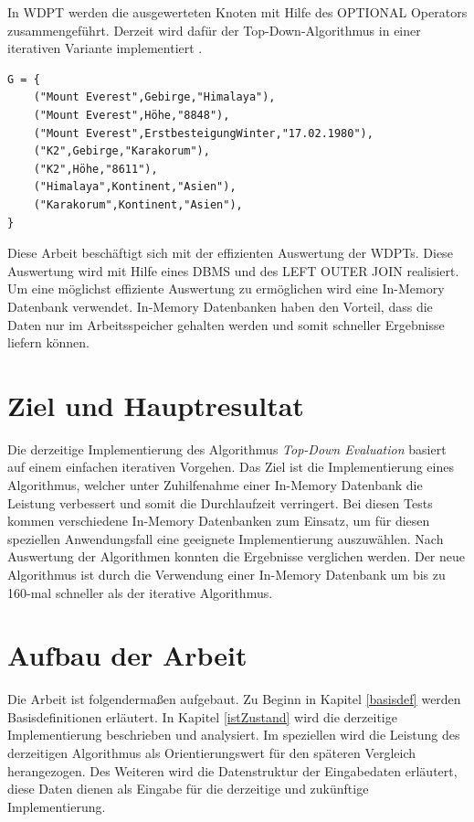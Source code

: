 \documentclass[draft,final]{vutinfth} %
\begin{document}
\pagebreak

In WDPT werden die ausgewerteten Knoten mit Hilfe des OPTIONAL Operators zusammengeführt. Derzeit wird dafür der Top-Down-Algorithmus \cite{LPPS2013} in einer iterativen Variante implementiert \cite{OptMat}.

\begin{lstlisting}[float,caption={Beispiel RDF Graph},frame = single,label={rdfGraphExample}]
G = { 
	("Mount Everest",Gebirge,"Himalaya"),
	("Mount Everest",Höhe,"8848"),
	("Mount Everest",ErstbesteigungWinter,"17.02.1980"),
	("K2",Gebirge,"Karakorum"), 
	("K2",Höhe,"8611"),
	("Himalaya",Kontinent,"Asien"),
	("Karakorum",Kontinent,"Asien"),
}
\end{lstlisting}



Diese Arbeit beschäftigt sich mit der effizienten Auswertung der WDPTs. Diese Auswertung wird mit Hilfe eines DBMS und des LEFT OUTER JOIN realisiert. Um eine möglichst effiziente Auswertung zu ermöglichen wird eine In-Memory Datenbank verwendet. In-Memory Datenbanken haben den Vorteil, dass die Daten nur im Arbeitsspeicher gehalten werden und somit schneller Ergebnisse liefern können. 

\section*{Ziel und Hauptresultat}
Die derzeitige Implementierung \cite{OptMat} des Algorithmus \textit{Top-Down Evaluation} \cite{LPPS2013} basiert auf einem einfachen iterativen Vorgehen. Das Ziel ist die Implementierung eines Algorithmus, welcher unter Zuhilfenahme einer In-Memory Datenbank die Leistung verbessert und somit die Durchlaufzeit verringert. Bei diesen Tests kommen verschiedene In-Memory Datenbanken zum Einsatz, um für diesen speziellen Anwendungsfall eine geeignete Implementierung auszuwählen. Nach Auswertung der Algorithmen konnten die Ergebnisse verglichen werden. Der neue Algorithmus ist durch die Verwendung einer In-Memory Datenbank um bis zu 160-mal schneller als der iterative Algorithmus. 

\section*{Aufbau der Arbeit}
Die Arbeit ist folgenderma{\ss}en aufgebaut. Zu Beginn in Kapitel \ref{basisdef} werden Basisdefinitionen erläutert. In Kapitel \ref{istZustand} wird die derzeitige Implementierung beschrieben und analysiert. Im speziellen wird die Leistung des derzeitigen Algorithmus als Orientierungswert für den späteren Vergleich herangezogen. Des Weiteren wird die Datenstruktur der Eingabedaten erläutert, diese Daten dienen als Eingabe für die derzeitige und zukünftige Implementierung.
\end{document}
